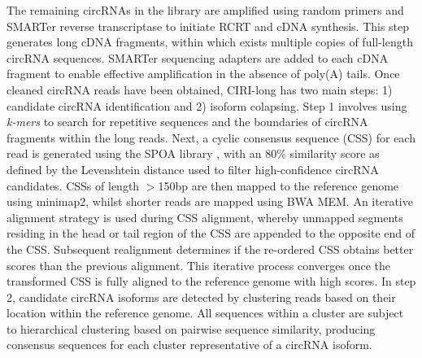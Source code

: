 The remaining circRNAs in the library are amplified using random primers and SMARTer reverse transcriptase to initiate RCRT and cDNA synthesis. This step generates long cDNA fragments, within which exists multiple copies of full-length circRNA sequences. SMARTer sequencing adapters are added to each cDNA fragment to enable effective amplification in the absence of poly(A) tails. Once cleaned circRNA reads have been obtained, CIRI-long has two main steps: 1) candidate circRNA identification and 2) isoform colapsing. Step 1 involves using \textit{k-mers} to search for repetitive sequences and the boundaries of circRNA fragments within the long reads. Next, a cyclic consensus sequence (CSS) for each read is generated using the SPOA library \cite{Vaser2017May}, with an 80\% similarity score as defined by the Levenshtein distance used to filter high-confidence circRNA candidates. CSSs of length $>$150bp are then mapped to the reference genome using minimap2, whilst shorter reads are mapped using BWA MEM. An iterative alignment strategy is used during CSS alignment, whereby unmapped segments residing in the head or tail region of the CSS are appended to the opposite end of the CSS. Subsequent realignment determines if the re-ordered CSS obtains better scores than the previous alignment. This iterative process converges once the transformed CSS is fully aligned to the reference genome with high scores. In step 2, candidate circRNA isoforms are detected by clustering reads based on their location within the reference genome. All sequences within a cluster are subject to hierarchical clustering based on pairwise sequence similarity, producing consensus sequences for each cluster representative of a circRNA isoform. \par

